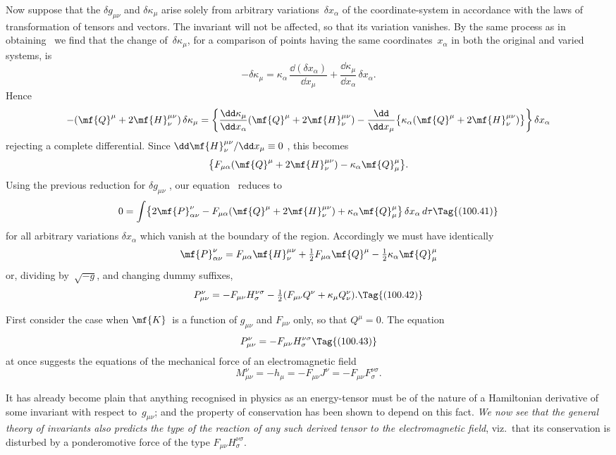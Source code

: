 \documentclass[12pt]{book}
\begin{document}
Now suppose that the $\delta g_{\mu\nu}$ and $\delta\kappa_{\mu}$ arise solely from arbitrary variations~$\delta x_{\alpha}$
of the coordinate-system in accordance with the laws of transformation
of tensors and vectors. The invariant will not be affected, so that its variation
vanishes. By the same process as in obtaining~ we find that the change
of~$\delta\kappa_{\mu}$, for a comparison of points having the same coordinates~$x_{\alpha}$ in both the
original and varied systems, is
\[
-\delta\kappa_{\mu}
= \kappa_{\alpha}\, \frac{\dd(\delta x_{\alpha})}{\dd x_{\mu}}
+ \frac{\dd\kappa_{\mu}}{\dd x_{\alpha}}\, \delta x_{\alpha}.
\]
Hence
\[
-(\mf{Q}^{\mu} + 2\mf{H}_{\nu}^{\mu\nu})\, \delta\kappa_{\mu}
= \left\{\frac{\dd\kappa_{\mu}}{\dd x_{\alpha}} (\mf{Q}^{\mu} + 2\mf{H}_{\nu}^{\mu\nu})
- \frac{\dd}{\dd x_{\mu}} \bigl\{\kappa_{\alpha} (\mf{Q}^{\mu} + 2\mf{H}_{\nu}^{\mu\nu})\bigr\}\right\} \delta x_{\alpha}
\]
rejecting a complete differential. Since $\dd\mf{H}_{\nu}^{\mu\nu}/\dd x_{\mu} \equiv 0$ , this becomes
\[
\bigl\{F_{\mu\alpha} (\mf{Q}^{\mu} + 2\mf{H}_{\nu}^{\mu\nu}) - \kappa_{\alpha} \mf{Q}_{\mu}^{\mu}\bigr\}.
\]
Using the previous reduction for $\delta g_{\mu\nu}$ , our equation~ reduces to
\[
0 = \int \bigl\{2 \mf{P}_{\alpha\nu}^{\nu}
- F_{\mu\alpha} (\mf{Q}^{\mu} + 2\mf{H}_{\nu}^{\mu\nu})
+ \kappa_{\alpha} \mf{Q}_{\mu}^{\mu}\bigr\}\, \delta x_{\alpha}\, d\tau
\Tag{(100.41)}
\]
for all arbitrary variations $\delta x_{\alpha}$ which vanish at the boundary of the region.
Accordingly we must have identically
\[
\mf{P}_{\alpha\nu}^{\nu}
= F_{\mu\alpha} \mf{H}_{\nu}^{\mu\nu}
+ \tfrac{1}{2} F_{\mu\alpha} \mf{Q}^{\mu}
- \tfrac{1}{2} \kappa_{\alpha} \mf{Q}_{\mu}^{\mu}
\]
or, dividing by~$\sqrt{-g}$, and changing dummy suffixes,
\[
P_{\mu\nu}^{\nu}
= -F_{\mu\nu} H_{\sigma}^{\nu\sigma}
- \tfrac{1}{2} (F_{\mu\nu} Q^{\nu} + \kappa_{\mu} Q_{\nu}^{\nu}).
\Tag{(100.42)}
\]

First consider the case when $\mf{K}$~is a function of $g_{\mu\nu}$ and $F_{\mu\nu}$ only, so that
$Q^{\mu} = 0$. The equation
\[
P_{\mu\nu}^{\nu} = -F_{\mu\nu} H_{\sigma}^{\nu\sigma}
\Tag{(100.43)}
\]
at once suggests the equations of the mechanical force of an electromagnetic
%
%
field
\[
M_{\mu\nu}^{\nu} = -h_{\mu} = -F_{\mu\nu} J^{\nu} = -F_{\mu\nu} F_{\sigma}^{\nu\sigma}.
\]

It has already become plain that anything recognised in physics as an
energy-tensor must be of the nature of a Hamiltonian derivative of some
invariant with respect to~$g_{\mu\nu}$; and the property of conservation has been
shown to depend on this fact. \emph{We now see that the general theory of invariants
also predicts the type of the reaction of any such derived tensor to the
electromagnetic field}, viz.\ that its conservation is disturbed by a ponderomotive
force of the type $F_{\mu\nu} H_{\sigma}^{\nu\sigma}$.
%
\end{document}
